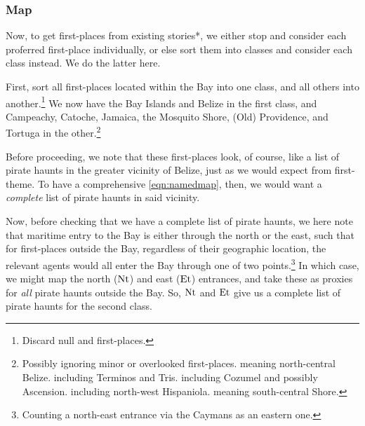 		\subsubsection{Map}
		\label{sss:map}
			Now, to get first-places from existing stories*, we either stop and consider each proferred first-place individually, or else sort them into classes and consider each class instead. We do the latter here.
		
			First, sort all first-places located within the Bay into one class, and all others into another.\footnote{Discard null and  first-places.} We now have the Bay Islands and Belize in the first class, and Campeachy, Catoche, Jamaica, the Mosquito Shore, (Old) Providence, and Tortuga in the other.\footnote{Possibly ignoring minor or overlooked first-places.  meaning north-central Belize.  including Terminos and Tris.  including Cozumel and possibly Ascension.  including north-west Hispaniola.  meaning south-central Shore.}
		
			Before proceeding, we note that these first-places look, of course, like a list of pirate haunts in the greater vicinity of Belize, just as we would expect from first-theme. To have a comprehensive \ref{eqn:namedmap}, then, we would want a \emph{complete} list of pirate haunts in said vicinity.
			
			Now, before checking that we have a complete list of pirate haunts, we here note that maritime entry to the Bay is either through the north or the east, such that for first-places outside the Bay, regardless of their geographic location, the relevant agents would all enter the Bay through one of two points.\footnote{Counting a north-east entrance via the Caymans as an eastern one.} In which case, we might map the north (\(\operatorname{Nt}\)) and east (\(\operatorname{Et}\)) entrances, and take these as proxies for \emph{all} pirate haunts outside the Bay. So, \(\operatorname{Nt}\) and \(\operatorname{Et}\) give us a complete list of pirate haunts for the second class.
		
